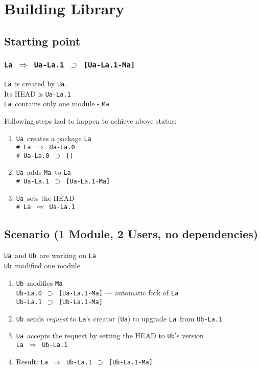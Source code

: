 \documentclass[10pt]{article}
\def\Ua{{\tt Ua}}
\def\Ub{{\tt Ub}}
\def\La{{\tt La}}
\def\Ma{{\tt Ma}}
\def\headsto{${\Longrightarrow}$ }
\def\hto{\headsto}
\def\eq{${\supset}$ }
\begin{document}
\section{Building Library}

	\subsection{Starting point}

		\subsubsection*{{\tt La \hto  Ua-La.1 \eq [Ua-La.1-Ma]}}
			\La\ is created by \Ua.\\
			Its HEAD is {\tt Ua-La.1}\\
			\La\ contains only one module - \Ma
			
			\noindent Following steps had to happen to achieve above status:
			\begin{enumerate}
				\item{\Ua\ creates a package \La\\
				    {\tt \# La \hto  Ua-La.0} \\
				    {\tt \# Ua-La.0 \eq []}
				}
				\item{\Ua\ adds \Ma\ to \La\\
					{\tt \# Ua-La.1 \eq [Ua-La.1-Ma]}
				}
				\item{\Ua\ sets the HEAD\\
					{\tt \# La \hto  Ua-La.1}
				}
			\end{enumerate}
			
	\subsection{Scenario (1 Module, 2 Users, no dependencies)}
		\Ua\ and \Ub\ are working on \La\\
		\Ub\ modified one module

		\begin{enumerate}
			\item{\Ub\ modifies \Ma\\
            		{\tt Ub-La.0 \eq [Ua-La.1-Ma]} --- automatic fork of \La\\
				{\tt Ub-La.1 \eq [Ub-La.1-Ma]}
			}
			\item{\Ub\ sends {\em request} to \La's creator (\Ua) to upgrade \La\ from {\tt Ub-La.1}}
			\item{\Ua\ accepts the request by setting the HEAD to \Ub's version\\
				{\tt La \hto  Ub-La.1}
			}
			\item{Result: {\tt La \hto  Ub-La.1 \eq [Ub-La.1-Ma]}}
		\end{enumerate}
\end{document}
